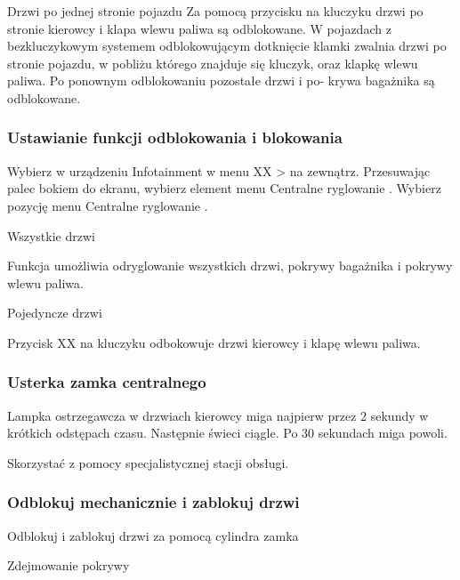 Drzwi po jednej stronie pojazdu
Za pomocą przycisku na kluczyku drzwi po stronie kierowcy i klapa wlewu paliwa są odblokowane.
W pojazdach z bezkluczykowym systemem odblokowującym dotknięcie klamki zwalnia drzwi po stronie pojazdu, w pobliżu którego znajduje się kluczyk, oraz klapkę wlewu paliwa.
Po ponownym odblokowaniu pozostałe drzwi i po-
krywa bagażnika są odblokowane.

\subsubsection{Ustawianie funkcji odblokowania i blokowania}

\begin{itemizeArrow}
	\itemArrow Wybierz w urządzeniu Infotainment w menu XX > na zewnątrz.
	\itemArrow Przesuwając palec bokiem do ekranu, wybierz element menu Centralne ryglowanie .
	\itemArrow Wybierz pozycję menu Centralne ryglowanie .
\end{itemizeArrow}

Wszystkie drzwi

Funkcja umożliwia odryglowanie wszystkich drzwi, pokrywy bagażnika i pokrywy wlewu paliwa.

Pojedyncze drzwi

Przycisk XX na kluczyku odbokowuje drzwi kierowcy i klapę wlewu paliwa.

\subsubsection{Usterka zamka centralnego}

\begin{itemizeTriangle}
	\itemTriangle Lampka ostrzegawcza w drzwiach kierowcy miga najpierw przez 2 sekundy w krótkich odstępach czasu.
	\itemTriangle Następnie świeci ciągle.
	\itemTriangle Po 30 sekundach miga powoli.
	\begin{itemizeArrow}
		\itemArrow Skorzystać z pomocy specjalistycznej stacji obsługi.
	\end{itemizeArrow}
\end{itemizeTriangle}


\subsubsection{Odblokuj mechanicznie i zablokuj drzwi}

Odblokuj i zablokuj drzwi za pomocą cylindra zamka

Zdejmowanie pokrywy


